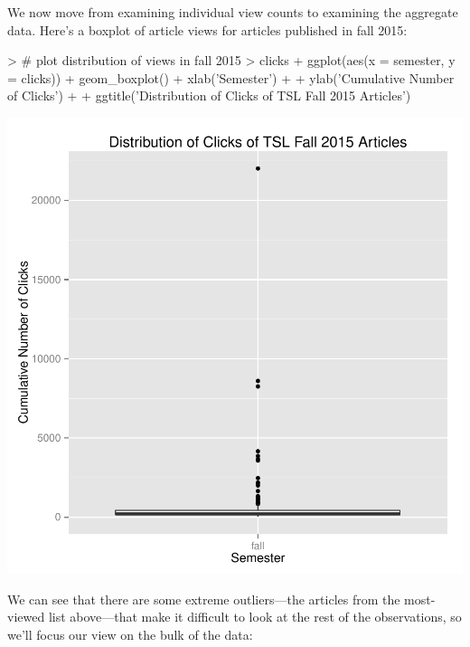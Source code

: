 \documentclass[a4paper]{article}
\begin{document}
We now move from examining individual view counts to examining the aggregate data. Here's a boxplot of article views for articles published in fall 2015:

\begin{Schunk}
\begin{Sinput}
> # plot distribution of views in fall 2015
> clicks %
+   ggplot(aes(x = semester, y = clicks)) + geom_boxplot() + xlab('Semester') +
+   ylab('Cumulative Number of Clicks') +
+   ggtitle('Distribution of Clicks of TSL Fall 2015 Articles')
\end{Sinput}
\end{Schunk}
\includegraphics{FinalProject-024}


We can see that there are some extreme outliers---the articles from the most-viewed list above---that make it difficult to look at the rest of the observations, so we'll focus our view on the bulk of the data:
\end{document}
